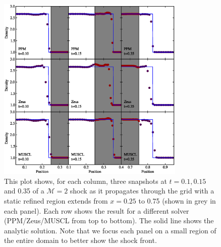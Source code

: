 \begin{figure}
\begin{center}
\includegraphics[width=0.8\textwidth]{figures/ShockPool}
\caption{This plot shows, for each column, three snapshots at $t=0.1, 0.15$ and 0.35 of a $\mathcal{M}=2$ shock as it propagates through the grid with a static refined region extends from $x = 0.25$ to 0.75 (shown in grey in each panel).   Each row shows the result for a different solver (PPM/Zeus/MUSCL from top to bottom).  The solid line shows the analytic solution.  Note that we focus each panel on a small region of the entire domain to better show the shock front.}
\label{fig.shockpool}
\end{center}
\end{figure}
